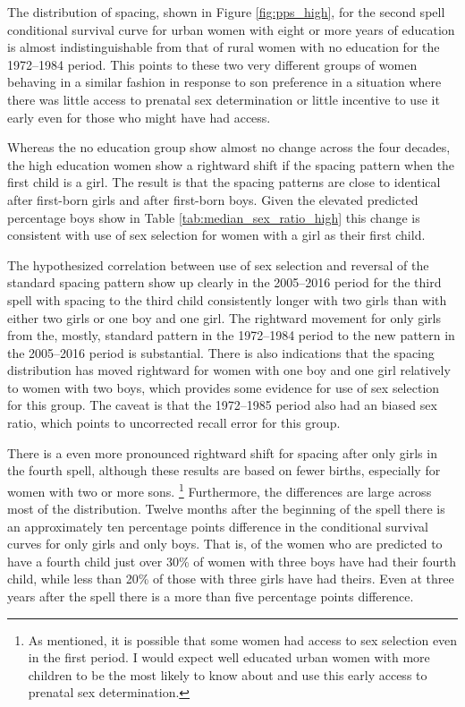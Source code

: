 \documentclass[12pt,letterpaper]{article}
\begin{document}
The distribution of spacing, shown in Figure \ref{fig:pps_high}, for the second spell 
conditional survival curve for urban women with eight or more years of education 
is almost indistinguishable from that of rural women with no education 
for the 1972--1984 period.
This points to these two very different groups of women behaving in a similar fashion
in response to son preference in a situation where there was little access to
prenatal sex determination or little incentive to use it early even for those 
who might have had access.

Whereas the no education group show almost no change across the four decades,
the high education women show a rightward shift if the spacing pattern when
the first child is a girl.
The result is that the spacing patterns are close to identical after first-born 
girls and after first-born boys.
Given the elevated predicted percentage boys show in Table 
\ref{tab:median_sex_ratio_high} this change is consistent with use of 
sex selection for women with a girl as their first child.

The hypothesized correlation between use of sex selection and reversal of 
the standard spacing pattern show up clearly in the 2005--2016 period for the 
third spell with spacing to the third child consistently longer with two girls 
than with either two girls or one boy and one girl.
The rightward movement for only girls from the, mostly, standard pattern in 
the 1972--1984 period to the new pattern in the 2005--2016 period is substantial.
There is also indications that the spacing distribution has moved rightward
for women with one boy and one girl relatively to women with two boys, which
provides some evidence for use of sex selection for this group.
The caveat is that the 1972--1985 period also had an biased sex ratio, which
points to uncorrected recall error for this group.

There is a even more pronounced rightward shift for spacing after only girls
in the fourth spell, although these results are based on fewer births, especially
for women with two or more sons.%
\footnote{
As mentioned, it is possible that some women had access to sex selection even
in the first period.
I would expect well educated urban women with more children to be the
most likely to know about and use this early access to prenatal sex determination.
}
Furthermore, the differences are large across most of the distribution.
Twelve months after the beginning of the spell there is an approximately ten 
percentage points difference in the conditional survival curves for only girls
and only boys.
That is, of the women who are predicted to have a fourth child just over 30\%
of women with three boys have had their fourth child, while less than 20\% of
those with three girls have had theirs.
Even at three years after the spell there is a more than five percentage
points difference.
\end{document}
